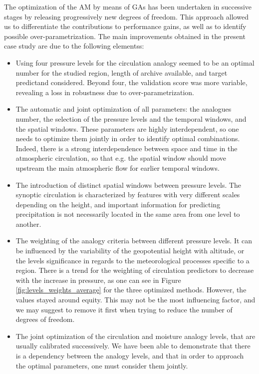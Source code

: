 \documentclass[review]{elsarticle}
\begin{document}
The optimization of the AM by means of GAs has been undertaken in successive stages by releasing progressively new degrees of freedom. This approach allowed us to differentiate the contributions to performance gains, as well as to identify possible over-parametrization. The main improvements obtained in the present case study are due to the following elementss:

\begin{itemize}
	\item Using four pressure levels for the circulation analogy seemed to be an optimal number for the studied region, length of archive available, and target predictand considered. Beyond four, the validation score was more variable, revealing a loss in robustness due to over-parametrization.
	\item The automatic and joint optimization of all parameters: the analogues number, the selection of the pressure levels and the temporal windows, and the spatial windows. These parameters are highly interdependent, so one needs to optimize them jointly in order to identify optimal combinations. Indeed, there is a strong interdependence between space and time in the atmospheric circulation, so that e.g. the spatial window should move upstream the main atmospheric flow for earlier temporal windows.
	\item The introduction of distinct spatial windows between pressure levels. The synoptic circulation is characterized by features with very different scales depending on the height, and important information for predicting precipitation is not necessarily located in the same area from one level to another.
	\item The weighting of the analogy criteria between different pressure levels. It can be influenced by the variability of the geopotential height with altitude, or the levels significance in regards to the meteorological processes specific to a region. There is a trend for the weighting of circulation predictors to decrease with the increase in pressure, as one can see in Figure \ref{fig:levels_weights_average} for the three optimized methods. However, the values stayed around equity. This may not be the most influencing factor, and we may suggest to remove it first when trying to reduce the number of degrees of freedom.
	\item The joint optimization of the circulation and moisture analogy levels, that are usually calibrated successively. We have been able to demonstrate that there is a dependency between the analogy levels, and that in order to approach the optimal parameters, one must consider them jointly.
\end{itemize}
\end{document}
